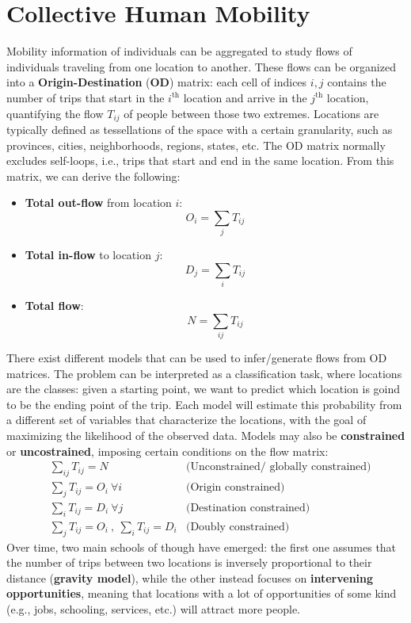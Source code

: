 \section{Collective Human Mobility}

Mobility information of individuals can be aggregated to study flows of individuals traveling from one location to another. These flows can be organized into a \textbf{Origin-Destination} (\textbf{OD}) matrix: each cell of indices $i,j$ contains the number of trips that start in the $i^{\text{th}}$ location and arrive in the $j^{\text{th}}$ location, quantifying the flow $T_{ij}$ of people between those two extremes. Locations are typically defined as tessellations of the space with a certain granularity, such as provinces, cities, neighborhoods, regions, states, etc. The OD matrix normally excludes self-loops, i.e., trips that start and end in the same location. From this matrix, we can derive the following:
\begin{itemize}
    \item \textbf{Total out-flow} from location $i$:
    \begin{equation*}
        O_i = \sum_j T_{ij}
    \end{equation*}
    \item \textbf{Total in-flow} to location $j$:
    \begin{equation*}
        D_j = \sum_i T_{ij}
    \end{equation*}
    \item \textbf{Total flow}:
    \begin{equation*}
        N = \sum_{ij} T_{ij}
    \end{equation*}
\end{itemize}

There exist different models that can be used to infer/generate flows from OD matrices. The problem can be interpreted as a classification task, where locations are the classes: given a starting point, we want to predict which location is goind to be the ending point of the trip. Each model will estimate this probability from a different set of variables that characterize the locations, with the goal of maximizing the likelihood of the observed data. Models may also be \textbf{constrained} or \textbf{uncostrained}, imposing certain conditions on the flow matrix:
\begin{align*}
    &\sum_{ij} T_{ij} = N & \text{(Unconstrained/ globally constrained)} \\
    &\sum_j T_{ij} = O_i \ \forall i &\text{(Origin constrained)} \\
    &\sum_i T_{ij} = D_i \ \forall j &\text{(Destination constrained)} \\
    &\sum_j T_{ij} = O_i \ , \ \sum_i T_{ij} = D_i &\text{(Doubly constrained)}
\end{align*}
Over time, two main schools of though have emerged: the first one assumes that the number of trips between two locations is inversely proportional to their distance (\textbf{gravity model}), while the other instead focuses on \textbf{intervening opportunities}, meaning that locations with a lot of opportunities of some kind (e.g., jobs, schooling, services, etc.) will attract more people.

